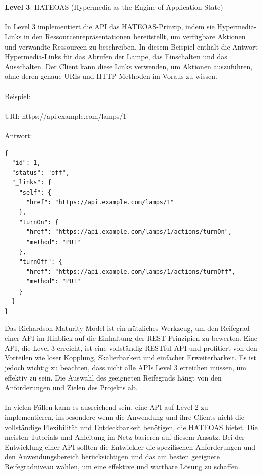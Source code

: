 \\\\
\textbf{Level 3}: HATEOAS (Hypermedia as the Engine of Application State)
\\\\
In Level 3 implementiert die API das HATEOAS-Prinzip, indem sie Hypermedia-Links in den Ressourcenrepräsentationen bereitstellt, um verfügbare Aktionen und verwandte Ressourcen zu beschreiben. In diesem Beispiel enthält die Antwort Hypermedia-Links für das Abrufen der Lampe, das Einschalten und das Ausschalten. Der Client kann diese Links verwenden, um Aktionen auszuführen, ohne deren genaue URIs und HTTP-Methoden im Voraus zu wissen.
\\\\
Beispiel:
\\\\
URI: https://api.example.com/lamps/1
\\\\
Antwort:\\
\begin{lstlisting}[caption={Level 3 (HATEOAS)},captionpos=b,label={lst:level_3}]
{
  "id": 1,
  "status": "off",
  "_links": {
    "self": {
      "href": "https://api.example.com/lamps/1"
    },
    "turnOn": {
      "href": "https://api.example.com/lamps/1/actions/turnOn",
      "method": "PUT"
    },
    "turnOff": {
      "href": "https://api.example.com/lamps/1/actions/turnOff",
      "method": "PUT"
    }
  }
}
\end{lstlisting}

Das Richardson Maturity Model ist ein nützliches Werkzeug, um den Reifegrad einer API im Hinblick auf die Einhaltung der REST-Prinzipien zu bewerten. Eine API, die Level 3 erreicht, ist eine vollständig RESTful API und profitiert von den Vorteilen wie loser Kopplung, Skalierbarkeit und einfacher Erweiterbarkeit. Es ist jedoch wichtig zu beachten, dass nicht alle APIs Level 3 erreichen müssen, um effektiv zu sein. Die Auswahl des geeigneten Reifegrads hängt von den Anforderungen und Zielen des Projekts ab.
\\\\
In vielen Fällen kann es ausreichend sein, eine API auf Level 2 zu implementieren, insbesondere wenn die Anwendung und ihre Clients nicht die vollständige Flexibilität und Entdeckbarkeit benötigen, die HATEOAS bietet. Die meisten Tutorials und Anleitung im Netz basieren auf diesem Ansatz. Bei der Entwicklung einer API sollten die Entwickler die spezifischen Anforderungen und den Anwendungsbereich berücksichtigen und das am besten geeignete Reifegradniveau wählen, um eine effektive und wartbare Lösung zu schaffen.
